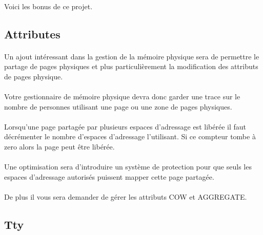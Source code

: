 \documentclass[10pt,a4wide]{article}
\begin{document}
\paragraph{}

Voici les bonus de ce projet.

\subsection{Attributes}

\paragraph{}

Un ajout int\'eressant dans la gestion de la m\'emoire physique sera
de permettre le partage de pages physiques et plus particuli\`erement
la modification des attributs de pages physique.

\paragraph{}

Votre gestionnaire de m\'emoire physique devra donc garder une trace sur
le nombre de personnes utilisant une page ou une zone de pages physiques.

\paragraph{}

Lorsqu'une page partag\'ee par plusieurs espaces d'adressage est lib\'er\'ee
il faut d\'ecr\'ementer le nombre d'espaces d'adressage l'utilisant. Si ce
compteur tombe \`a zero alors la page peut \^etre lib\'er\'ee.

\paragraph{}

Une optimisation sera d'introduire un syst\`eme de protection pour que
seuls les espaces d'adressage autoris\'es puissent mapper cette page
partag\'ee.

\paragraph{}

De plus il vous sera demander de g\'erer les attributs COW et AGGREGATE.

\subsection{Tty}
\end{document}
